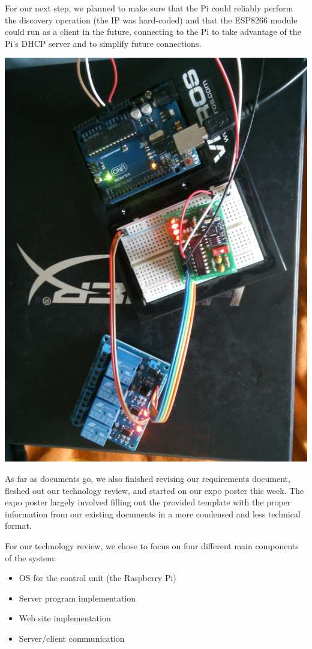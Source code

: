 \documentclass[letterpaper,10pt]{article}
\begin{document}
For our next step, we planned to make sure that the Pi could reliably perform
the discovery operation (the IP was hard-coded) and that the ESP8266 module
could run as a client in the future, connecting to the Pi to take advantage of
the Pi's DHCP server and to simplify future connections.

\includegraphics[scale=0.1]{circuit.jpg}

As far as documents go, we also finished revising our requirements document,
fleshed out our technology review, and started on our expo poster this week.
The expo poster largely involved filling out the provided template with the
proper information from our existing documents in a more condensed and less
technical format.

For our technology review, we chose to focus on four different main components of the system:

\begin{itemize}
    \item OS for the control unit (the Raspberry Pi)
    \item Server program implementation
    \item Web site implementation
    \item Server/client communication
\end{itemize}
\end{document}
